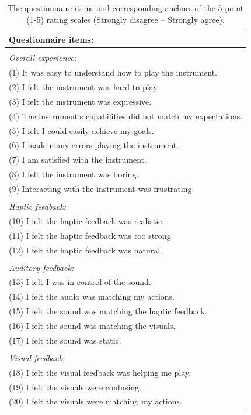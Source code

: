 \documentclass[dvipsnames, pdftex]{article}
\begin{document}
\begin{table}[h]
\centering
  \small
    \begin{tabular}{p{}}
    \textbf{Questionnaire items:} \\
    \hline
    \\[-0.1in]
    \textit{Overall experience:} \\
    (1) It was easy to understand how to play the instrument.\\
    (2) I felt the instrument was hard to play.\\
    (3) I felt the instrument was expressive.\\
    (4) The instrument's capabilities did not match my expectations.\\
    (5) I felt I could easily achieve my goals.\\
    (6) I made many errors playing the instrument.\\
    (7) I am satisfied with the instrument.\\
    (8) I felt the instrument was boring.\\
    (9) Interacting with the instrument was frustrating.\\
    \hline
    \\[-0.1in]
    \textit{Haptic feedback:}  \\
    (10) I felt the haptic feedback was realistic.\\
    (11) I felt the haptic feedback was too strong.\\
    (12) I felt the haptic feedback was natural.\\
    \hline
    \\[-0.1in]
    \textit{Auditory feedback:}\\
    (13) I felt I was in control of the sound.\\
    (14) I felt the audio was matching my actions.\\
    (15) I felt the sound was matching the haptic feedback.\\
    (16) I felt the sound was matching the visuals.\\ 
    (17) I felt the sound was static.\\ 
    \hline
    \\[-0.1in]
    \textit{Visual feedback:}\\
    (18) I felt the visual feedback was helping me play.\\
    (19) I felt the visuals were confusing.\\
    (20) I felt the visuals were matching my actions.\\
    
    \hline
    \end{tabular}%
      \caption{The questionnaire items and corresponding anchors of the 5 point (1-5) rating scales (Strongly disagree -- Strongly agree).}
  \label{tab:questions}
\end{table}
%
\end{document}
